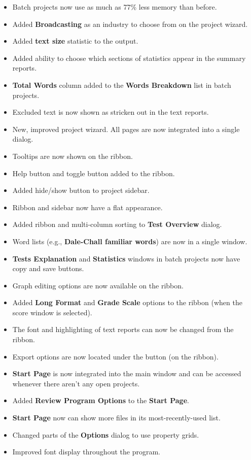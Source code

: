 \documentclass[
]{book}
\providecommand{\tightlist}{%
  \setlength{\itemsep}{0pt}\setlength{\parskip}{0pt}}
\theoremstyle{definition}
\theoremstyle{definition}
\theoremstyle{definition}
\theoremstyle{definition}
\theoremstyle{remark}
\begin{document}
\begin{itemize}
\tightlist
\item
  Batch projects now use as much as 77\% less memory than before.
\item
  Added \textbf{Broadcasting} as an industry to choose from on the project wizard.
\item
  Added \textbf{text size} statistic to the output.
\item
  Added ability to choose which sections of statistics appear in the summary reports.
\item
  \textbf{Total Words} column added to the \textbf{Words Breakdown} list in batch projects.
\item
  Excluded text is now shown as stricken out in the text reports.
\item
  New, improved project wizard. All pages are now integrated into a single dialog.
\item
  Tooltips are now shown on the ribbon.
\item
  Help button and toggle button added to the ribbon.
\item
  Added hide/show button to project sidebar.
\item
  Ribbon and sidebar now have a flat appearance.
\item
  Added ribbon and multi-column sorting to \textbf{Test Overview} dialog.
\item
  Word lists (e.g., \textbf{Dale-Chall familiar words}) are now in a single window.
\item
  \textbf{Tests Explanation} and \textbf{Statistics} windows in batch projects now have copy and save buttons.
\item
  Graph editing options are now available on the ribbon.
\item
  Added \textbf{Long Format} and \textbf{Grade Scale} options to the ribbon (when the score window is selected).
\item
  The font and highlighting of text reports can now be changed from the ribbon.
\item
  Export options are now located under the  button (on the ribbon).
\item
  \textbf{Start Page} is now integrated into the main window and can be accessed whenever there aren't any open projects.
\item
  Added \textbf{Review Program Options} to the \textbf{Start Page}.
\item
  \textbf{Start Page} now can show more files in its most-recently-used list.
\item
  Changed parts of the \textbf{Options} dialog to use property grids.
\item
  Improved font display throughout the program.
\end{itemize}
\end{document}
